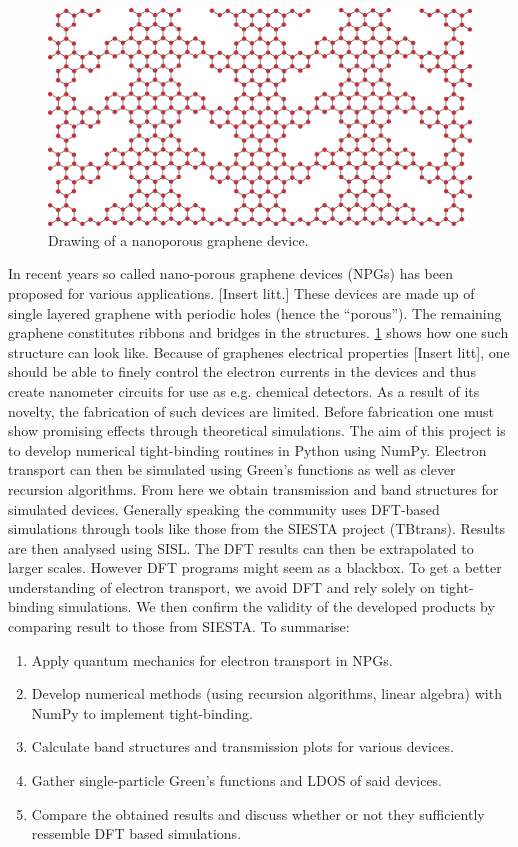\begin{figure}
\vspace{-1em}
	\centering
	\includegraphics[width=.4\textwidth]{Figures/NPGintroGraphic.eps}
    \caption{Drawing of a nanoporous graphene device.}\label{introGraphic}
\end{figure}
In recent years so called nano-porous graphene devices (NPGs) has been proposed for various applications. [Insert litt.] These devices are made up of single layered graphene with periodic holes (hence the ``porous''). The remaining graphene constitutes ribbons and bridges in the structures. \cref{introGraphic} shows how one such structure can look like.
Because of graphenes electrical properties [Insert litt], one should be able to finely control the electron currents in the devices and thus create nanometer circuits for use as e.g. chemical detectors. As a result of its novelty, the fabrication of such devices are limited. Before fabrication one must show promising effects through theoretical simulations.\newline
The aim of this project is to develop numerical tight-binding routines in Python using NumPy. Electron transport can then be simulated using Green's functions as well as clever recursion algorithms. From here we obtain transmission and band structures for simulated devices.\newline
Generally speaking the community uses DFT-based simulations through tools like those from the SIESTA project (TBtrans). Results are then analysed using SISL\cite{zerothi_sisl}. The DFT results can then be extrapolated to larger scales\cite{calogero_electron_2019}. However DFT programs might seem as a blackbox. To get a better understanding of electron transport, we avoid DFT and rely solely on tight-binding simulations. We then confirm the validity of the developed products by comparing result to those from SIESTA.\newline
To summarise:
\begin{enumerate}
	\item Apply quantum mechanics for electron transport in NPGs.
	\item Develop numerical methods (using recursion algorithms, linear algebra) with NumPy to implement tight-binding.
	\item Calculate band structures and transmission plots for various devices.
	\item Gather single-particle Green’s functions and LDOS of said devices.
	\item Compare the obtained results and discuss whether or not they sufficiently ressemble DFT based simulations.
\end{enumerate}
